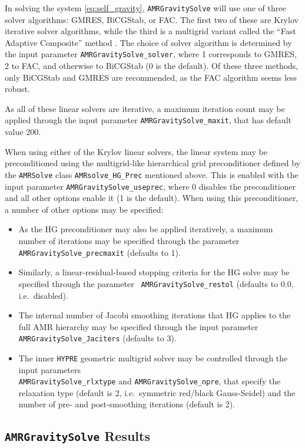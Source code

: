 \documentclass[letterpaper,10pt]{article}
\renewcommand{\(}{\left(}
\renewcommand{\)}{\right)}
\newcommand{\amrsolve}{{\tt AMRSolve} }
\newcommand{\hypre}{{\tt HYPRE} }
\begin{document}
In solving the system \eqref{eq:self_gravity}, {\tt AMRGravitySolve}
will use one of three solver algorithms: GMRES, BiCGStab, or FAC.  The
first two of these are Krylov iterative solver algorithms, while the
third is a multigrid variant called the ``Fast Adaptive Composite''
method \cite{McCormick1989}.  The choice of solver algorithm is
determined by the input parameter {\tt AMRGravitySolve\_solver}, where
1 corresponds to GMRES, 2 to FAC, and otherwise to BiCGStab (0 is the
default).  Of these three methods, only BiCGStab and GMRES are
recommended, as the FAC algorithm seems less robust.

As all of these linear solvers are iterative, a maximum iteration
count may be applied through the input parameter 
{\tt AMRGravitySolve\_maxit}, that has default value 200.

When using either of the Krylov linear solvers, the linear system may
be preconditioned using the multigrid-like hierarchical grid
preconditioner defined by the \amrsolve class {\tt AMRsolve\_HG\_Prec}
mentioned above.  This is enabled with the input parameter 
{\tt AMRGravitySolve\_useprec}, where 0 disables the preconditioner
and all other options enable it (1 is the default).  When using this
preconditioner, a number of other options may be specified:
\begin{itemize}
\item As the HG preconditioner may also be applied iteratively, a
  maximum number of iterations may be specified through the parameter
  {\tt AMRGravitySolve\_precmaxit} (defaults to 1).
\item Similarly, a linear-residual-based stopping criteria for the HG
  solve may be specified through the parameter {\tt
  AMRGravitySolve\_restol} (defaults to 0.0, i.e.~disabled).
\item The internal number of Jacobi smoothing iterations that HG
  applies to the full AMR hierarchy may be specified through the input
  parameter {\tt AMRGravitySolve\_Jaciters} (defaults to 3).
\item The inner \hypre geometric multigrid solver may be controlled
  through the input parameters \\
  {\tt AMRGravitySolve\_rlxtype} and  
  {\tt AMRGravitySolve\_npre}, that specify the relaxation type
  (default is 2, i.e.~symmetric red/black Gauss-Seidel) and the number
  of pre- and post-smoothing iterations (default is 2).
\end{itemize}


\subsection{{\tt AMRGravitySolve} Results}
\label{sec:AMRGravitySolve_results}
\end{document}
